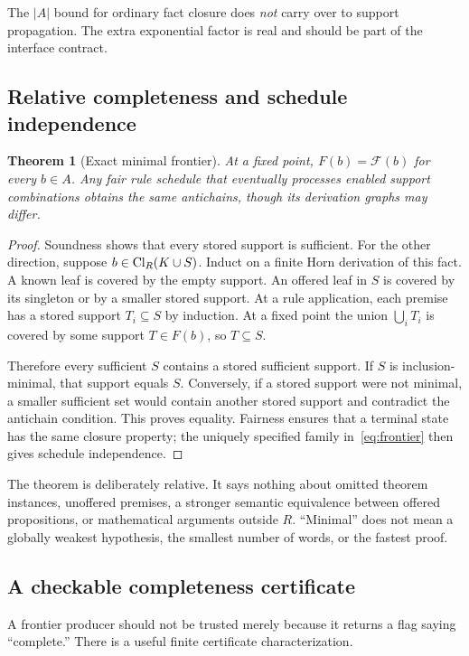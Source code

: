 \documentclass[11pt,a4paper]{article}
\newtheorem{theorem}{Theorem}[section]
\theoremstyle{definition}\newtheorem{definition}[theorem]{Definition}
\theoremstyle{remark}\newtheorem{remark}[theorem]{Remark}
\begin{document}
The $|A|$ bound for ordinary fact closure does \emph{not} carry over to support propagation. The extra exponential factor is real and should be part of the interface contract.

\subsection{Relative completeness and schedule independence}
\begin{theorem}[Exact minimal frontier]\label{thm:complete}
At a fixed point, $F(b)=\mathcal F(b)$ for every $b\in A$. Any fair rule schedule that eventually processes enabled support combinations obtains the same antichains, though its derivation graphs may differ.
\end{theorem}
\begin{proof}
Soundness shows that every stored support is sufficient. For the other direction, suppose $b\in\operatorname{Cl}_R(K\cup S)$. Induct on a finite Horn derivation of this fact. A known leaf is covered by the empty support. An offered leaf in $S$ is covered by its singleton or by a smaller stored support. At a rule application, each premise has a stored support $T_i\subseteq S$ by induction. At a fixed point the union $\bigcup_i T_i$ is covered by some support $T\in F(b)$, so $T\subseteq S$.

Therefore every sufficient $S$ contains a stored sufficient support. If $S$ is inclusion-minimal, that support equals $S$. Conversely, if a stored support were not minimal, a smaller sufficient set would contain another stored support and contradict the antichain condition. This proves equality. Fairness ensures that a terminal state has the same closure property; the uniquely specified family in~\eqref{eq:frontier} then gives schedule independence.
\end{proof}

The theorem is deliberately relative. It says nothing about omitted theorem instances, unoffered premises, a stronger semantic equivalence between offered propositions, or mathematical arguments outside $R$. ``Minimal'' does not mean a globally weakest hypothesis, the smallest number of words, or the fastest proof.

\subsection{A checkable completeness certificate}
A frontier producer should not be trusted merely because it returns a flag saying ``complete.'' There is a useful finite certificate characterization.
\end{document}
